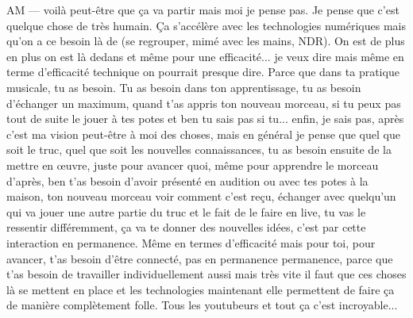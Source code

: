 AM — voilà peut-être que ça va partir mais moi je pense pas. Je pense que c'est quelque chose de très humain. Ça s'accélère avec les technologies numériques mais qu'on a ce besoin là de (se regrouper, mimé avec les mains, NDR). On est de plus en plus on est là dedans et même pour une efficacité... je veux dire mais même en terme d'efficacité technique on pourrait presque dire. Parce que dans ta pratique musicale, tu as besoin. Tu as besoin dans ton apprentissage, tu as besoin d'échanger un maximum, quand t'as appris ton nouveau morceau, si tu peux pas tout de suite le jouer à tes potes et ben tu sais pas si tu... enfin, je sais pas, après c'est ma vision peut-être à moi des choses, mais en général je pense que quel que soit le truc, quel que soit les nouvelles connaissances, tu as besoin ensuite de la mettre en œuvre, juste pour avancer quoi, même pour apprendre le morceau d'après, ben t'as besoin d'avoir présenté en audition ou avec tes potes à la maison, ton nouveau morceau voir comment c'est reçu, échanger avec quelqu'un qui va jouer une autre partie du truc et le fait de le faire en live, tu vas le ressentir différemment, ça va te donner des nouvelles idées, c'est par cette interaction en permanence. Même en termes d'efficacité mais pour toi, pour avancer, t'as besoin d'être connecté, pas en permanence permanence, parce que t'as besoin de travailler individuellement aussi mais très vite il faut que ces choses là se mettent en place et les technologies maintenant elle permettent de faire ça de manière complètement folle. Tous les youtubeurs et tout ça c'est incroyable... 
